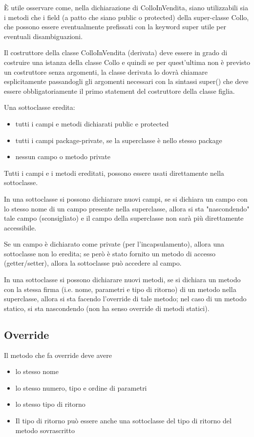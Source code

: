 \documentclass[a4paper,12pt,twoside]{book}
\begin{document}
È utile osservare come, nella dichiarazione di ColloInVendita, siano
utilizzabili sia i metodi che i field (a patto che siano public o
protected) della super-classe Collo, che possono essere eventualmente
prefissati con la keyword super utile per eventuali disambiguazioni.

Il costruttore della classe ColloInVendita (derivata) deve essere in
grado di costruire una istanza della classe Collo e quindi se per
quest’ultima non è previsto un costruttore senza argomenti, la classe
derivata lo dovrà chiamare esplicitamente passandogli gli argomenti
necessari con la sintassi super() che deve essere obbligatoriamente
il primo statement del costruttore della classe figlia.

Una sottoclasse eredita:
\begin{itemize}
\item tutti i campi e metodi dichiarati public e protected
\item tutti i campi package-private, se la superclasse è nello stesso
  package
\item nessun campo o metodo private
\end{itemize}
Tutti i campi e i metodi ereditati, possono essere usati direttamente
nella sottoclasse.

In una sottoclasse si possono dichiarare nuovi campi, se si dichiara
un campo con lo stesso nome di un campo presente nella superclasse,
allora si sta "nascondendo" tale campo (sconsigliato) e il campo della
superclasse non sarà più direttamente accessibile.

Se un campo è dichiarato come private (per l’incapsulamento), allora
una sottoclasse non lo eredita; se però è stato fornito un metodo di
accesso (getter/setter), allora la sottoclasse può accedere al campo.

In una sottoclasse si possono dichiarare nuovi metodi, se si dichiara
un metodo con la stessa firma (i.e. nome, parametri e tipo di ritorno)
di un metodo nella superclasse, allora si sta facendo l’override di
tale metodo; nel caso di un metodo statico, si sta nascondendo (non ha
senso override di metodi statici).

\subsection{Override}

Il metodo che fa override deve avere
\begin{itemize}
\item lo stesso nome
\item lo stesso numero, tipo e ordine di parametri
\item lo stesso tipo di ritorno
\item Il tipo di ritorno può essere anche una sottoclasse del tipo di
  ritorno del metodo sovrascritto
\end{itemize}
\end{document}
